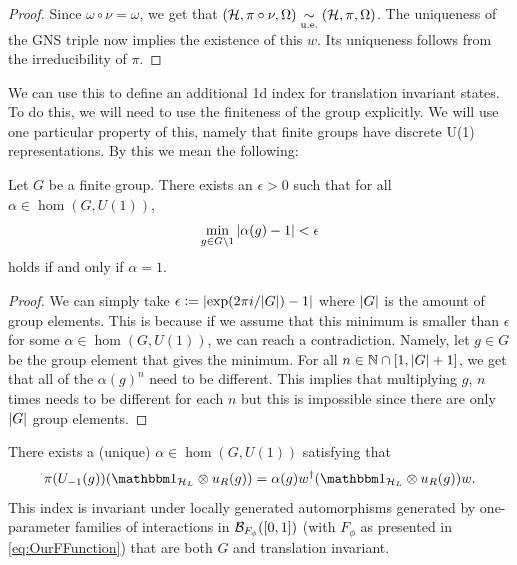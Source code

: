 \documentclass[11pt,a4paper,twoside]{article}
\numberwithin{equation}{section}
\begin{document}
	\begin{proof}
		Since $\omega\circ\nu=\omega$, we get that $(\mathcal H,\pi\circ\nu,\Omega)\underset{\text{u.e.}}{\sim} (\mathcal H,\pi,\Omega)$. The uniqueness of the GNS triple now implies the existence of this $w$. Its uniqueness follows from the irreducibility of $\pi$.
	\end{proof}
	We can use this to define an additional 1d index for translation invariant states. To do this, we will need to use the finiteness of the group explicitly. We will use one particular property of this, namely that finite groups have discrete U(1) representations. By this we mean the following:
	\begin{lemma}\label{lem:FiniteGroupsHaveDiscreteU(1)Representations}
		Let $G$ be a finite group. There exists an $\epsilon>0$ such that for all $\alpha\in\hom(G,U(1))$,
		\begin{equation}
			\min_{g\in G\setminus 1}\abs{\alpha(g)-1}<\epsilon
		\end{equation}
		holds if and only if $\alpha=1$.
	\end{lemma}
	\begin{proof}
		We can simply take $\epsilon\vcentcolon= \abs{\exp(2\pi i/\abs{G})-1}$ where $\abs{G}$ is the amount of group elements. This is because if we assume that this minimum is smaller than $\epsilon$ for some $\alpha\in\hom(G,U(1))$, we can reach a contradiction. Namely, let $g\in G$ be the group element that gives the minimum. For all $n\in\mathbb{N}\cap [1,\abs{G}+1]$, we get that all of the $\alpha(g)^n$ need to be different. This implies that multiplying $g$, $n$ times needs to be different for each $n$ but this is impossible since there are only $\abs{G}$ group elements.
	\end{proof}
	\begin{lemma}
		There exists a (unique) $\alpha\in\hom(G,U(1))$ satisfying that
		\begin{equation}
			\pi(U_{-1}(g)) (\id_{\HH_L}\otimes u_R(g))=\alpha(g)w^\dagger(\id_{\HH_L}\otimes u_R(g)) w.
		\end{equation}
		This index is invariant under locally generated automorphisms generated by one-parameter families of interactions in $\mathcal B_{F_\phi}([0,1])$ (with $F_\phi$ as presented in \eqref{eq:OurFFunction}) that are both $G$ and translation invariant.
	\end{lemma}
\end{document}
